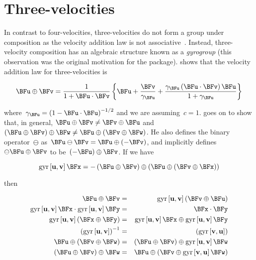 \documentclass[ijoc,nonblindrev]{informs3} %
\begin{document}
\section{Three-velocities}

In contrast to four-velocities, three-velocities do not form a group
under composition as the velocity addition law is not
associative~\citep{ungar2006}.  Instead, three-velocity composition
has an algebraic structure known as a {\em gyrogroup} (this
observation was the original motivation for the package).
\citeauthor{ungar2006} shows that the velocity addition law for
three-velocities is

\begin{equation}
\BFu\oplus\BFv= \frac{1}{1+\BFu\cdot\BFv} \left\{ \BFu +
\frac{\BFv}{\gamma_\BFu} + \frac{\gamma_\BFu
  \left(\BFu\cdot\BFv\right)\BFu}{1+\gamma_\BFu} \right\}
\end{equation}
   
where~$\gamma_\BFu=\left(1-\BFu\cdot\BFu\right)^{-1/2}$ and we are
assuming~$c=1$.  \citeauthor{ungar2006} goes on to show that, in
general, $\BFu\oplus\BFv\neq\BFv\oplus\BFu$
and~$(\BFu\oplus\BFv)\oplus\BFw\neq\BFu\oplus(\BFv\oplus\BFw)$.  He also
defines the binary operator~$\ominus$
as~$\BFu\ominus\BFv=\BFu\oplus\left(-\BFv\right)$, and implicitly
defines~$\ominus\BFu\oplus\BFv$ to be~$\left(-\BFu\right)\oplus\BFv$.  If
we have

\begin{equation}
\gyr{u}{v}\BFx=-\left(\BFu\oplus\BFv\right)\oplus\left(\BFu\oplus\left(\BFv\oplus\BFx\right)\right)
\end{equation}

then

\begin{eqnarray}
\BFu\oplus\BFv &=&
\gyr{u}{v}\left(\BFv\oplus\BFu\right)\label{noncom}\\ \gyr{u}{v}\BFx\cdot\gyr{u}{v}\BFy
&=& \BFx\cdot\BFy\label{doteq}\\ \gyr{u}{v}\left(\BFx\oplus\BFy\right) &=&
\gyr{u}{v}\BFx\oplus\gyr{u}{v}\BFy\\ \left(\gyr{u}{v}\right)^{-1} &=&
\left(\gyr{v}{u}\right)\label{gyrinv}\\ \BFu\oplus\left(\BFv\oplus\BFw\right)
&=&\left(\BFu\oplus\BFv\right)\oplus\gyr{u}{v}\BFw\label{nonass1}\\ \left(\BFu\oplus\BFv\right)\oplus\BFw
&=&\BFu\oplus\left(\BFv\oplus\gyr{v}{u}\BFw\right)\label{nonass2}
\end{eqnarray}
\end{document}
